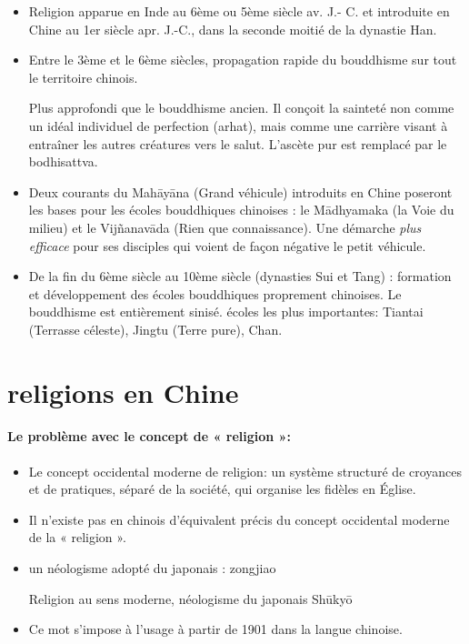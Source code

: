 \begin{itemize}
 \item 	Religion apparue en Inde au 6ème ou 5ème siècle av. J.- C. et introduite en Chine au 1er siècle apr. J.-C., dans la seconde moitié de la dynastie Han.
 \item 	Entre le 3ème et le 6ème siècles, propagation rapide du bouddhisme sur tout le territoire chinois.
 \begin{Def}
    Plus approfondi que le bouddhisme ancien.   Il conçoit la sainteté non comme un idéal individuel de perfection (arhat), mais comme une carrière visant à entraîner les autres créatures vers le salut. L'ascète pur est remplacé par le bodhisattva. 
\end{Def}
 \item Deux courants du Mahāyāna (Grand véhicule) introduits en Chine poseront les bases pour les écoles bouddhiques chinoises : le Mādhyamaka (la Voie du milieu) et le Vijñanavāda (Rien que
connaissance). Une démarche \textit{plus efficace} pour ses disciples qui voient de façon négative le petit véhicule. 

 \item De la fin du 6ème siècle au 10ème siècle (dynasties Sui et Tang) : formation et développement des écoles bouddhiques proprement chinoises. Le bouddhisme est entièrement sinisé.
écoles les plus importantes: Tiantai (Terrasse céleste), Jingtu (Terre pure), Chan.
\end{itemize}


\section{religions en Chine}
\paragraph{Le problème avec le concept de « religion »:}

\begin{itemize}
    \item  	Le concept occidental moderne de religion:
un système structuré de croyances et de pratiques, séparé de la société, qui organise les fidèles en Église.
    \item  Il n’existe pas en chinois d’équivalent précis du concept occidental moderne de la « religion ».
    \item  	un néologisme adopté du japonais : zongjiao  
    \begin{Def}[zongjiao - 宗教 ]
    Religion au sens moderne, néologisme du japonais  Shūkyō
\end{Def}
    \item  	Ce mot s’impose à l’usage à partir de 1901 dans la langue chinoise.
\end{itemize}

